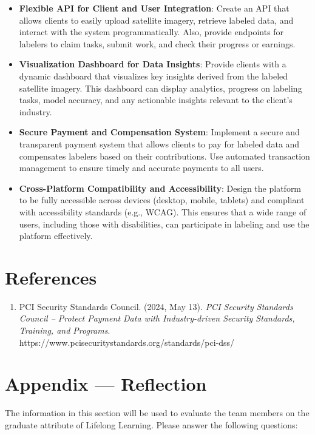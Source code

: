 \documentclass[12pt]{article}
\begin{document}
\begin{itemize}
    \item \textbf{Flexible API for Client and User Integration}: Create an API that allows clients to easily upload satellite imagery, retrieve labeled data, and interact with the system programmatically. Also, provide endpoints for labelers to claim tasks, submit work, and check their progress or earnings.
    
    \item \textbf{Visualization Dashboard for Data Insights}: Provide clients with a dynamic dashboard that visualizes key insights derived from the labeled satellite imagery. This dashboard can display analytics, progress on labeling tasks, model accuracy, and any actionable insights relevant to the client’s industry.
    
    \item \textbf{Secure Payment and Compensation System}: Implement a secure and transparent payment system that allows clients to pay for labeled data and compensates labelers based on their contributions. Use automated transaction management to ensure timely and accurate payments to all users.
    
    \item \textbf{Cross-Platform Compatibility and Accessibility}: Design the platform to be fully accessible across devices (desktop, mobile, tablets) and compliant with accessibility standards (e.g., WCAG). This ensures that a wide range of users, including those with disabilities, can participate in labeling and use the platform effectively.
\end{itemize}

\newpage{}
\section*{References}
\begin{enumerate}
    \item PCI Security Standards Council. (2024, May 13). \textit{PCI Security Standards Council – Protect Payment Data with Industry-driven Security Standards, Training, and Programs}. https://www.pcisecuritystandards.org/standards/pci-dss/
\end{enumerate}

\newpage{}
\section*{Appendix --- Reflection}

The information in this section will be used to evaluate the team members on the
graduate attribute of Lifelong Learning.  Please answer the following questions:
\end{document}
